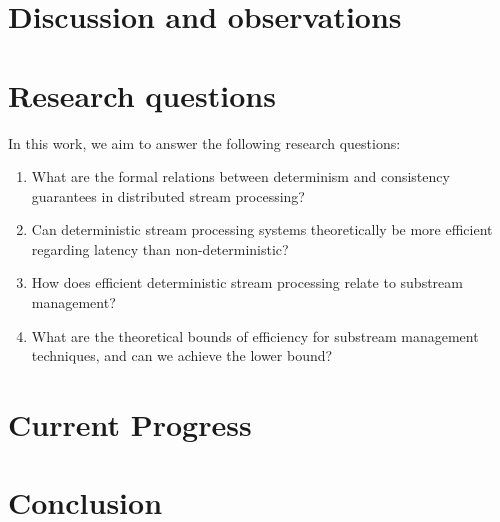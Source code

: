\documentclass[runningheads]{llncs}
\begin{document}
\section {Discussion and observations}

\section {Research questions}

In this work, we aim to answer the following research questions:
\begin{enumerate}
    \item What are the formal relations between determinism and consistency guarantees in distributed stream processing?
    \item Can deterministic stream processing systems theoretically be more efficient regarding latency than non-deterministic? 
    \item How does efficient deterministic stream processing relate to substream management?
    \item What are the theoretical bounds of efficiency for substream management techniques, and can we achieve the lower bound?
\end{enumerate}

\section {Current Progress}

\section {Conclusion}




\end{document}
